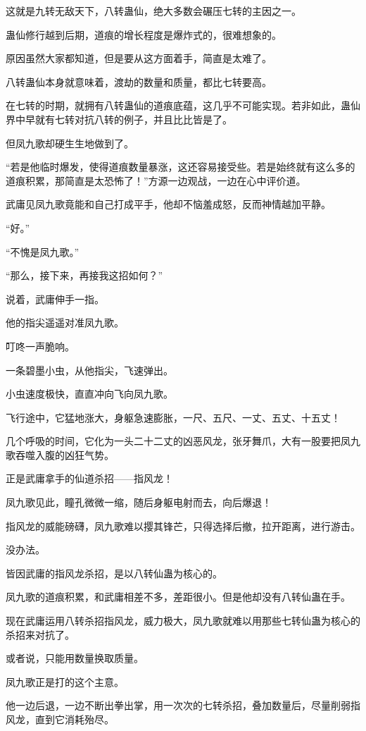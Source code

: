 \begin{this_body}
这就是九转无敌天下，八转蛊仙，绝大多数会碾压七转的主因之一。

蛊仙修行越到后期，道痕的增长程度是爆炸式的，很难想象的。

原因虽然大家都知道，但是要从这方面着手，简直是太难了。

八转蛊仙本身就意味着，渡劫的数量和质量，都比七转要高。

在七转的时期，就拥有八转蛊仙的道痕底蕴，这几乎不可能实现。若非如此，蛊仙界中早就有七转对抗八转的例子，并且比比皆是了。

但凤九歌却硬生生地做到了。

“若是他临时爆发，使得道痕数量暴涨，这还容易接受些。若是始终就有这么多的道痕积累，那简直是太恐怖了！”方源一边观战，一边在心中评价道。

武庸见凤九歌竟能和自己打成平手，他却不恼羞成怒，反而神情越加平静。

“好。”

“不愧是凤九歌。”

“那么，接下来，再接我这招如何？”

说着，武庸伸手一指。

他的指尖遥遥对准凤九歌。

叮咚一声脆响。

一条碧墨小虫，从他指尖，飞速弹出。

小虫速度极快，直直冲向飞向凤九歌。

飞行途中，它猛地涨大，身躯急速膨胀，一尺、五尺、一丈、五丈、十五丈！

几个呼吸的时间，它化为一头二十二丈的凶恶风龙，张牙舞爪，大有一股要把凤九歌吞噬入腹的凶狂气势。

正是武庸拿手的仙道杀招——指风龙！

凤九歌见此，瞳孔微微一缩，随后身躯电射而去，向后爆退！

指风龙的威能磅礴，凤九歌难以撄其锋芒，只得选择后撤，拉开距离，进行游击。

没办法。

皆因武庸的指风龙杀招，是以八转仙蛊为核心的。

凤九歌的道痕积累，和武庸相差不多，差距很小。但是他却没有八转仙蛊在手。

现在武庸运用八转杀招指风龙，威力极大，凤九歌就难以用那些七转仙蛊为核心的杀招来对抗了。

或者说，只能用数量换取质量。

凤九歌正是打的这个主意。

他一边后退，一边不断出拳出掌，用一次次的七转杀招，叠加数量后，尽量削弱指风龙，直到它消耗殆尽。


\end{this_body}
